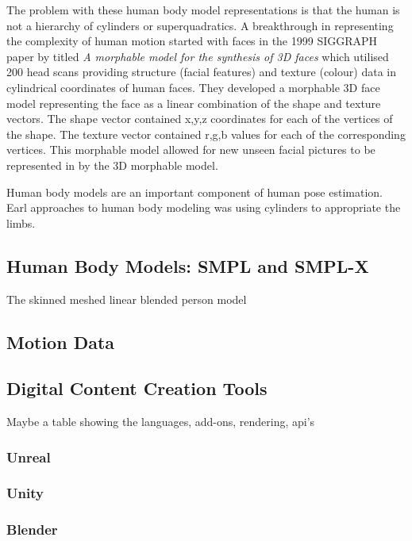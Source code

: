 The problem with these human body model representations is that the human is not a hierarchy of cylinders or superquadratics. 
A breakthrough in representing the complexity of human motion started with faces in the 1999 SIGGRAPH paper by \citet{blanz2023morphable} titled \textit{A morphable model for the synthesis of 3D faces} which utilised 200 head scans providing structure (facial features) and texture (colour) data in cylindrical coordinates of human faces. They developed a morphable 3D face model representing the face as a linear combination of the shape and texture vectors. The shape vector contained x,y,z coordinates for each of the vertices of the shape. The texture vector contained r,g,b values for each of the corresponding vertices. This morphable model allowed for new unseen facial pictures to be represented in by the 3D morphable model.



Human body models are an important component of human pose estimation. 
Earl approaches to human body modeling was using cylinders to appropriate the limbs.

\subsection{Human Body Models: SMPL and SMPL-X}
The skinned meshed linear blended person model
\cite{loper2015smpl}
\cite{SMPL-X:2019}
\cite{bregier2026human}

\subsection{Motion Data}
\cite{mahmood2019amass}
\cite{ghorbani2021soma}

\subsection{Digital Content Creation Tools}
Maybe a table showing the languages, add-ons, rendering, api's
\subsubsection{Unreal}
\subsubsection{Unity}
\subsubsection{Blender}

